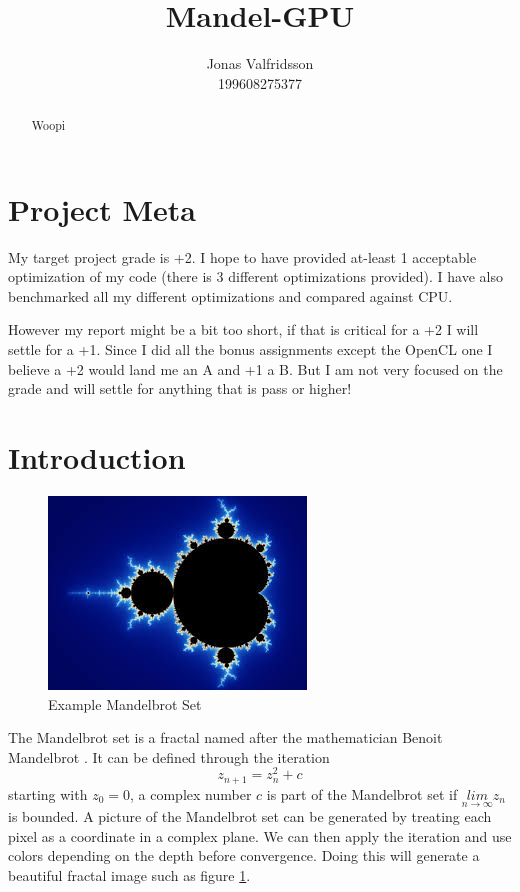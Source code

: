 \documentclass{article}
\title{Mandel-GPU}
\date{}
\author{Jonas Valfridsson\\199608275377}
\begin{document}
\maketitle

\begin{abstract}
   Woopi
\end{abstract}
\tableofcontents
\newpage

\section{Project Meta}%
\label{sec:project_meta}


My target project grade is +2. I hope to have provided at-least 1 acceptable optimization of
my code (there is 3 different optimizations provided). I have also benchmarked all my
different optimizations and compared against CPU.

However my report might be a bit too short, if that is critical for a +2 I will settle
for a +1. Since I did all the bonus assignments except the OpenCL one I believe a +2 would
land me an A and +1 a B. But I am not very focused on the grade and will settle for anything
that is pass or higher! 



\section{Introduction}%
\label{sec:introduction}


\begin{figure}
  \centering
  \includegraphics[width=0.6\linewidth]{external-images/mandelbrot.jpeg}
  \caption{Example Mandelbrot Set}
  \label{fig:mandelbrot}
\end{figure}

The Mandelbrot set is a fractal named after the mathematician Benoit Mandelbrot
\cite{mandelbrot}.
It can be defined through the iteration \cite{mandelbrot} $$ z_{n + 1} = z_n^2 + c $$ starting with $z_0 = 0$, a
complex number $c$ is part of the Mandelbrot set if $\underset{n \rightarrow \infty}{lim} z_n$
is bounded. A picture of the Mandelbrot set can be generated by treating each pixel as a
coordinate in a complex plane. We can then apply the iteration and use colors depending
on the depth before convergence. Doing this will generate a beautiful fractal image such as
figure \ref{fig:mandelbrot}.
\end{document}
